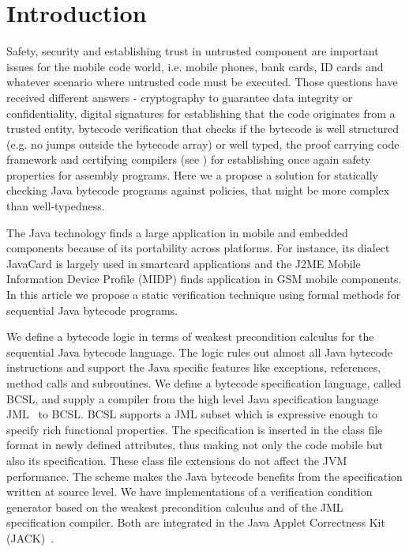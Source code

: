 
\section{Introduction}\label{intro}
Safety, security and establishing trust in untrusted component are important issues for the mobile code world, 
i.e. mobile phones, bank cards, ID cards and whatever scenario where 
untrusted code must be executed. Those questions have received different answers - cryptography to guarantee data integrity or confidentiality,
 digital signatures for establishing that the code originates from a trusted entity, bytecode verification that checks if the bytecode 
 is well structured (e.g. no jumps outside the bytecode array) or well typed, the proof carrying code framework and certifying compilers (see \cite{ComNec,DesNecLee98}) for establishing once again safety properties for assembly programs.  Here we a propose a solution for statically checking Java bytecode programs against
 policies, that might be more complex than well-typedness.



The Java technology finds a large application in mobile and embedded components because of its portability across platforms. 
For instance, its dialect JavaCard is largely used in smartcard applications and the J2ME Mobile Information Device Profile (MIDP) finds application in GSM mobile components. 
In this article we propose a static verification technique using formal methods for sequential Java bytecode programs.

We define a bytecode logic in terms of weakest precondition calculus for the sequential Java bytecode language. The logic rules out 
almost all Java bytecode instructions and support the Java specific features like 
exceptions, references, method calls and subroutines.  
 We define a bytecode specification language, called BCSL, and supply a compiler from 
 the high level Java specification language JML~\cite{JMLRefMan} to BCSL. 
 BCSL supports a JML subset which is expressive enough to specify rich functional properties. The specification is 
 inserted in the class file format in newly defined attributes, thus making not only the code mobile but also its specification. These class
 file extensions do not affect the JVM performance. The scheme makes the Java bytecode benefits from the specification written at source level.
 We have implementations of a verification condition generator based on the weakest precondition calculus and of the JML specification compiler. Both are integrated in the Java Applet Correctness Kit (JACK)~\cite{BRL-JACK}. 

